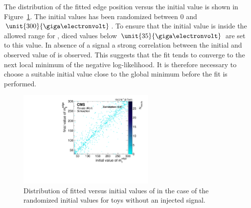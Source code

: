 The distribution of the fitted edge position versus the initial value is shown in Figure~\ref{fig:toys:backgroundOnlyFloatEdge}. The initial values has been randomized between 0 and $\unit{300}{\giga\electronvolt}$. To ensure that the initial value is inside the allowed range for \mlledge, diced values below $\unit{35}{\giga\electronvolt}$ are set to this value. In absence of a signal a strong correlation between the initial and observed value of \mlledge is observed. This suggests that the fit tends to converge to the next local minimum of the negative log-likelihood. It is therefore necessary to choose a suitable initial value close to the global minimum before the fit is performed. 

\begin{figure}[hbp]
  \centering

    \includegraphics[width=0.6\textwidth]{plots/results/fit/toyResults/fittedM0vsinitialM0_backgroundOnly_randM0_NegSig.pdf}
  \caption{Distribution of fitted versus initial values of \mlledge in the case of the randomized initial values for toys without an injected signal.}
  \label{fig:toys:backgroundOnlyFloatEdge}
\end{figure}

